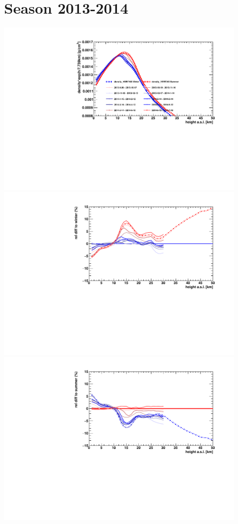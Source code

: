 \section*{Season 2013-2014}
\noindent\begin{minipage}{\textwidth}
\centering
\includegraphics[width=0.9\textwidth]{season-2013-2014-density.pdf}
\includegraphics[width=0.9\textwidth]{season-relativeWinter-2013-2014-density.pdf}
\includegraphics[width=0.9\textwidth]{season-relativeSummer-2013-2014-density.pdf}
\end{minipage}
